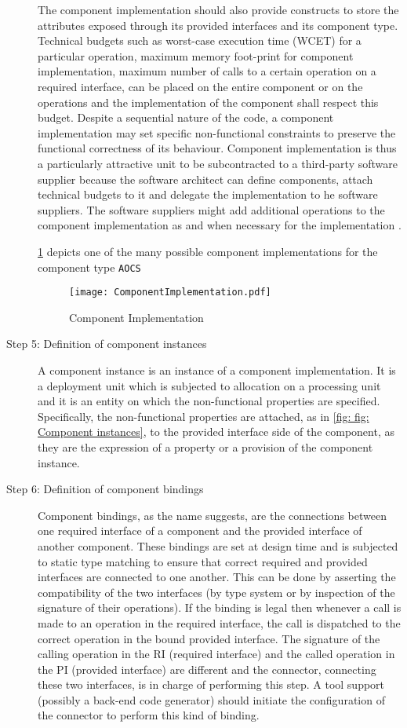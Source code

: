 \begin{description}
The component implementation should also provide constructs to store the attributes exposed through its provided interfaces and its component type. Technical budgets such as worst-case execution time (WCET) for a particular operation, maximum memory foot-print for component implementation, maximum number of calls to a certain operation on a required interface, can be placed on the entire component or on the operations and the implementation of the component shall respect this budget. Despite a sequential nature of the code, a component implementation may set specific non-functional constraints to preserve the functional correctness of its behaviour. Component implementation is thus a particularly attractive unit to be subcontracted to a third-party software supplier because the software architect can define components, attach technical budgets to it and delegate the implementation to he software suppliers. The software suppliers might add additional operations to the component implementation as and when necessary for the implementation \cite{CompBasedProcess}. 

\cref{fig: Component implementation} depicts one of the many possible component implementations for the component type \texttt{AOCS}

\begin{figure}[h]
	\centering
	\texttt{[image: ComponentImplementation.pdf]}
	\caption{Component Implementation}
	\label{fig: Component implementation}
\end{figure} 

\item [Step 5: Definition of component instances] A component instance is an instance of a component implementation. It is a deployment unit which is subjected to allocation on a processing unit and it is an entity on which the non-functional properties are specified. Specifically, the non-functional properties are attached, as in \cref{fig: fig: Component instances}, to the provided interface side of the component, as they are the expression of a property or a provision of the component instance.

\item [Step 6: Definition of component bindings] Component bindings, as the name suggests, are the connections between one required interface of a component and the provided interface of another component. These bindings are set at design time and is subjected to static type matching to ensure that correct required and provided interfaces are connected to one another. This can be done by asserting the compatibility of the two interfaces (by type system or by inspection of the signature of their operations). If the binding is legal then whenever a call is made to an operation in the required interface, the call is dispatched to the correct operation in the bound provided interface. The signature of the calling operation in the RI (required interface) and the called operation in the PI (provided interface) are different and the connector, connecting these two interfaces, is in charge of performing this step. A tool support (possibly a back-end code generator) should initiate the configuration of the connector to perform this kind of binding.


\end{description}
